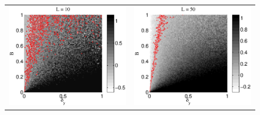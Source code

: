 \documentclass[a4paper,11pt,twocolumn]{article}
\begin{document}
\begin{figure}[ht]
\begin{tabular}{cc}
\includegraphics[scale=0.30]{SimpleIRexample_diffLpart1.eps} &
\includegraphics[scale=0.30]{SimpleIRexample_diffLpart2.eps} \\

\end{tabular}
\end{figure}
\end{document}
